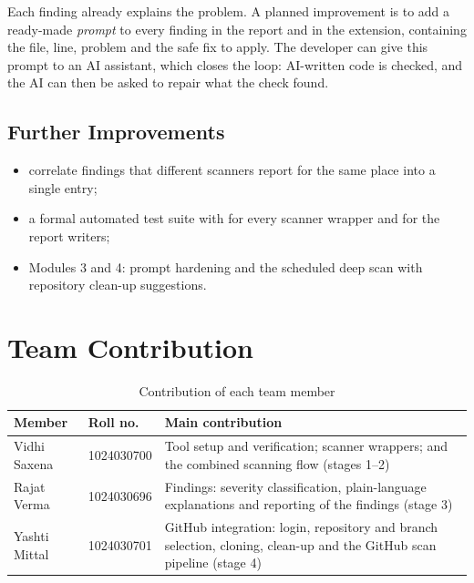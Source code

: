 \documentclass[12pt,a4paper]{article}
\newcommand{\code}[1]{\texttt{\detokenize{#1}}}
\begin{document}
Each finding already explains the problem. A planned improvement is to add a ready-made \emph{prompt} to every finding in the report and in the extension, containing the file, line, problem and the safe fix to apply. The developer can give this prompt to an AI assistant, which closes the loop: AI-written code is checked, and the AI can then be asked to repair what the check found.

\subsection{Further Improvements}

\begin{itemize}
    \item correlate findings that different scanners report for the same place into a single entry;
    \item a formal automated test suite with \code{pytest} for every scanner wrapper and for the report writers;
    \item Modules 3 and 4: prompt hardening and the scheduled deep scan with repository clean-up suggestions.
\end{itemize}

\section{Team Contribution}

\begin{table}[H]
\centering
\caption{Contribution of each team member}
\label{tab:team}
\begin{tabularx}{\textwidth}{@{}p{3.6cm}p{2.7cm}X@{}}
\toprule
\textbf{Member} & \textbf{Roll no.} & \textbf{Main contribution} \\
\midrule
Vidhi Saxena & 1024030700 & Tool setup and verification; scanner wrappers; \code{SecurityEngine} and the combined scanning flow (stages 1--2) \\
Rajat Verma & 1024030696 & Findings: severity classification, plain-language explanations and reporting of the findings (stage 3) \\
Yashti Mittal & 1024030701 & GitHub integration: login, repository and branch selection, cloning, clean-up and the GitHub scan pipeline (stage 4) \\
\bottomrule
\end{tabularx}
\end{table}
\end{document}
